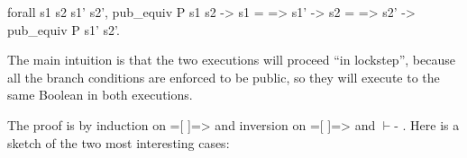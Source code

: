 \documentclass[12pt]{report}
\begin{document}
forall s1 s2 s1' s2',
  pub\_equiv P s1 s2 ->
  s1 =  => s1' ->
  s2 =  => s2' ->
  pub\_equiv P s1' s2'.


   The main intuition is that the two executions will proceed ``in
   lockstep'', because all the branch conditions are enforced to be
   public, so they will execute to the same Boolean in both executions. 

 The proof is by induction on  =[  ]=>  and inversion
    on  =[  ]=>  and  \ensuremath{\vdash}- . Here is a sketch of the two
    most interesting cases:
\end{document}
